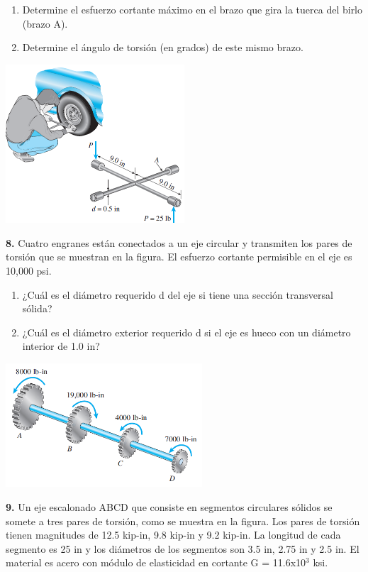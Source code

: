 \documentclass[12pt,letterpaper]{article}
\begin{document}
\begin{enumerate}[label=\alph*)]
\item Determine el esfuerzo cortante máximo en el brazo
que gira la tuerca del birlo (brazo A). 
\item Determine el ángulo de torsión (en grados) de este
mismo brazo.
\end{enumerate}

\begin{center}
\includegraphics[width=0.5\textwidth]{img/p7.PNG}
\end{center}

\textbf{8.} Cuatro engranes están conectados a un eje circular y
transmiten los pares de torsión que se muestran en la figura. El
esfuerzo cortante permisible en el eje es 10,000 psi.

\begin{enumerate}[label=\alph*,itemsep=1pt]
\item ¿Cuál es el diámetro requerido d del eje si tiene una
sección transversal sólida?
\item ¿Cuál es el diámetro exterior requerido d si el eje es
hueco con un diámetro interior de 1.0 in?
\end{enumerate}

\begin{center}
\includegraphics[width=0.55\textwidth]{img/p8.PNG}
\end{center}


\textbf{9.} Un eje escalonado ABCD que consiste en segmentos
circulares sólidos se somete a tres pares de torsión, como se
muestra en la figura. Los pares de torsión tienen magnitudes
de 12.5 kip-in, 9.8 kip-in y 9.2 kip-in. La longitud de cada segmento
es 25 in y los diámetros de los segmentos son 3.5 in, 2.75 in
y 2.5 in. El material es acero con módulo de elasticidad en
cortante G = 11.6x10$^3$ ksi.
\end{document}
